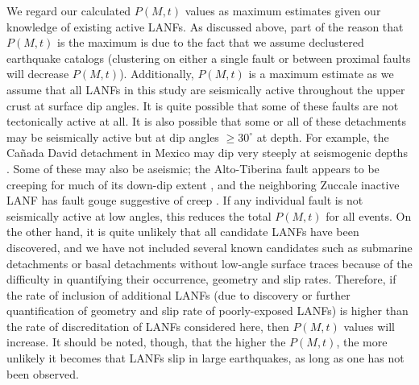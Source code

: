 \documentclass[draft,grl]{AGUTeX}
\begin{document}
\begin{article}
We regard our calculated $P(M,t)$ values as maximum estimates given our
knowledge of existing active LANFs. As discussed above, part of the reason that
$P(M,t)$ is the maximum is due to the fact that we assume declustered
earthquake catalogs (clustering on either a single fault or between proximal
faults will decrease $P(M,t)$). Additionally, $P(M,t)$ is a maximum estimate as
we assume that all LANFs in this study are seismically active throughout the
upper crust at surface dip angles. It is quite possible that some of these
faults are not tectonically active at all. It is also possible that some or all
of these detachments may be seismically active but at dip angles $\ge30^\circ$
at depth. For example, the Ca\~nada David detachment in Mexico may dip very
steeply at seismogenic depths \citep{fletcherspelz2009}. Some of these may also
be aseismic; the Alto-Tiberina fault appears to be creeping for much of its
down-dip extent \citep{hreinsdottir2009altotib}, and the neighboring Zuccale
inactive LANF has fault gouge suggestive of creep
\citep{collettiniholdsworth2004}. If any individual fault is not seismically
active at low angles, this reduces the total $P(M, t)$ for all events. On the
other hand, it is quite unlikely that all candidate LANFs have been discovered,
and we have not included several known candidates such as submarine detachments
\citep [e.g.,][]{abers2001} or basal detachments without low-angle surface
traces \citep [e.g.,][]{bernard1997} because of the difficulty in quantifying
their occurrence, geometry and slip rates. Therefore, if the rate of inclusion
of additional LANFs (due to discovery or further quantification of geometry and
slip rate of poorly-exposed LANFs) is higher than the rate of discreditation of
LANFs considered here, then $P(M,t)$ values will increase. It should be noted,
though, that the higher the $P(M,t)$, the more unlikely it becomes that LANFs
slip in large earthquakes, as long as one has not been observed.


\end{article}
\end{document}
